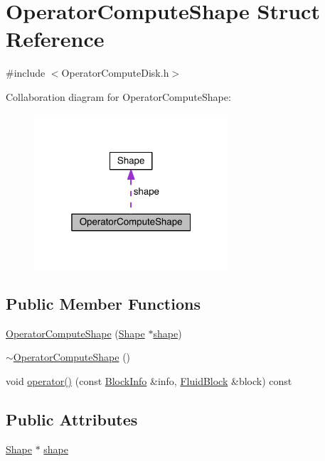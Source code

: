\hypertarget{struct_operator_compute_shape}{}\section{Operator\+Compute\+Shape Struct Reference}
\label{struct_operator_compute_shape}


{\ttfamily \#include $<$Operator\+Compute\+Disk.\+h$>$}



Collaboration diagram for Operator\+Compute\+Shape\+:\nopagebreak
\begin{figure}[H]
\begin{center}
\leavevmode
\includegraphics[width=205pt]{dd/d3d/struct_operator_compute_shape__coll__graph}
\end{center}
\end{figure}
\subsection*{Public Member Functions}
\begin{DoxyCompactItemize}
\item 
\hyperlink{struct_operator_compute_shape_a92dbcb63dd91d79e8cf40b76170a629c}{Operator\+Compute\+Shape} (\hyperlink{class_shape}{Shape} $\ast$\hyperlink{struct_operator_compute_shape_aed9a2a1e4b29d3fdc1d62ada8510d17b}{shape})
\item 
\hyperlink{struct_operator_compute_shape_a2691f394451b34f7e07b6a922af2177d}{$\sim$\+Operator\+Compute\+Shape} ()
\item 
void \hyperlink{struct_operator_compute_shape_ad9d3edd854162a93b5c7212bd694e73a}{operator()} (const \hyperlink{struct_block_info}{Block\+Info} \&info, \hyperlink{struct_fluid_block}{Fluid\+Block} \&block) const 
\end{DoxyCompactItemize}
\subsection*{Public Attributes}
\begin{DoxyCompactItemize}
\item 
\hyperlink{class_shape}{Shape} $\ast$ \hyperlink{struct_operator_compute_shape_aed9a2a1e4b29d3fdc1d62ada8510d17b}{shape}
\end{DoxyCompactItemize}


